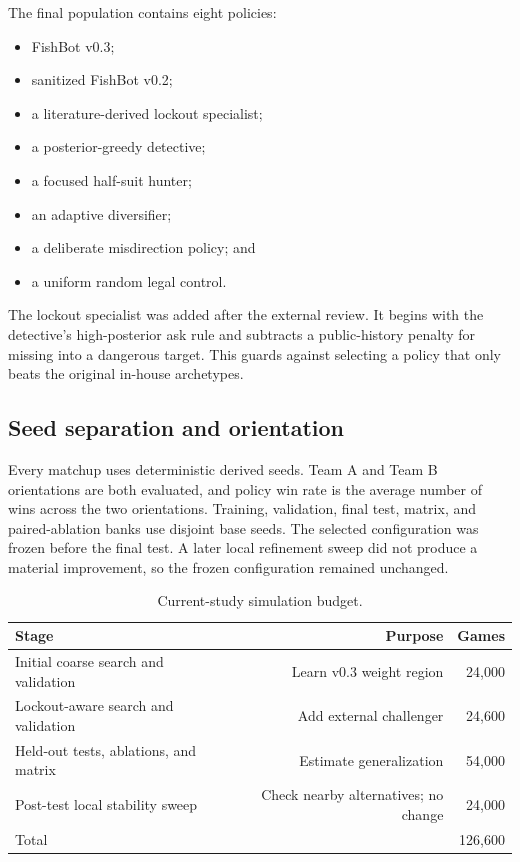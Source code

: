 \documentclass[11pt]{article}
\begin{document}
The final population contains eight policies:

\begin{itemize}
  \item FishBot v0.3;
  \item sanitized FishBot v0.2;
  \item a literature-derived lockout specialist;
  \item a posterior-greedy detective;
  \item a focused half-suit hunter;
  \item an adaptive diversifier;
  \item a deliberate misdirection policy; and
  \item a uniform random legal control.
\end{itemize}

The lockout specialist was added after the external review. It begins with the detective's high-posterior ask rule and subtracts a public-history penalty for missing into a dangerous target. This guards against selecting a policy that only beats the original in-house archetypes.

\subsection{Seed separation and orientation}

Every matchup uses deterministic derived seeds. Team A and Team B orientations are both evaluated, and policy win rate is the average number of wins across the two orientations. Training, validation, final test, matrix, and paired-ablation banks use disjoint base seeds. The selected configuration was frozen before the final test. A later local refinement sweep did not produce a material improvement, so the frozen configuration remained unchanged.

\begin{table}[ht]
\centering
\caption{Current-study simulation budget.}
\begin{tabular}{lrr}
\toprule
Stage & Purpose & Games \\
\midrule
Initial coarse search and validation & Learn v0.3 weight region & 24,000 \\
Lockout-aware search and validation & Add external challenger & 24,600 \\
Held-out tests, ablations, and matrix & Estimate generalization & 54,000 \\
Post-test local stability sweep & Check nearby alternatives; no change & 24,000 \\
\midrule
Total & & 126,600 \\
\bottomrule
\end{tabular}
\end{table}
\end{document}
